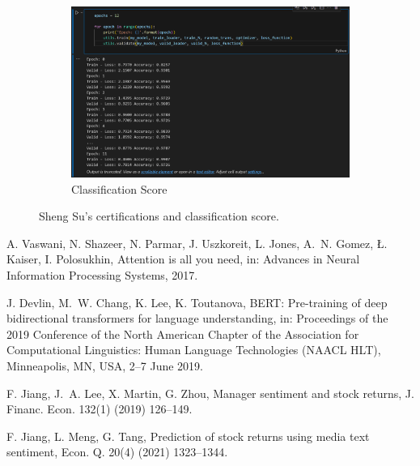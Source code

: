 \documentclass[12pt]{article}
\begin{document}
\begin{figure}[H]
	\begin{subfigure}[b]{0.8\textwidth}
		\includegraphics[width=\linewidth]{Sheng_Su_Classification_Score.png}
		\caption{Classification Score}
	\end{subfigure}
	\caption{Sheng Su's certifications and classification score.}
	\label{fig:SS_certification}
\end{figure}



\begin{thebibliography}{100}

	A. Vaswani, N. Shazeer, N. Parmar, J. Uszkoreit, L. Jones, A.~N. Gomez, {\L}. Kaiser, I. Polosukhin, 
	Attention is all you need, in: Advances in Neural Information Processing Systems, 2017.
	
	J. Devlin, M.~W. Chang, K. Lee, K. Toutanova, 
	BERT: Pre-training of deep bidirectional transformers for language understanding, in: Proceedings of the 2019 Conference of the North American Chapter of the Association for Computational Linguistics: Human Language Technologies (NAACL HLT), Minneapolis, MN, USA, 2--7 June 2019.
	
	F. Jiang, J.~A. Lee, X. Martin, G. Zhou, 
	Manager sentiment and stock returns, J. Financ. Econ. 132(1) (2019) 126--149.
	
	F. Jiang, L. Meng, G. Tang, 
	Prediction of stock returns using media text sentiment, Econ. Q. 20(4) (2021) 1323--1344.
	

\end{thebibliography}
\end{document}
